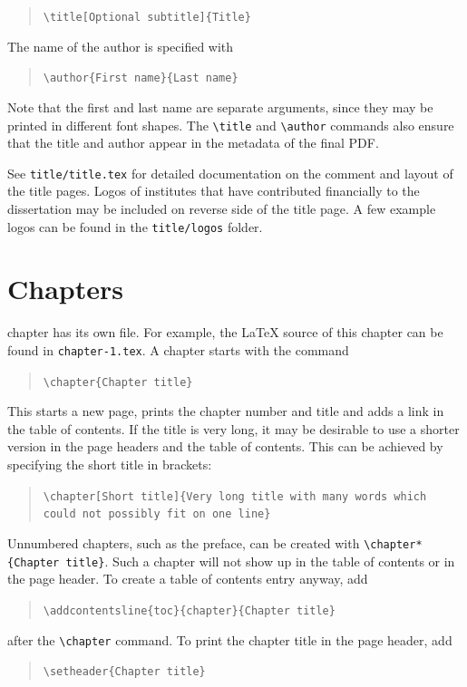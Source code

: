 \begin{quote}
\texttt{\textbackslash title[Optional subtitle]\{Title\}}
\end{quote}
The name of the author is specified with
\begin{quote}
\texttt{\textbackslash author\{First name\}\{Last name\}}
\end{quote}
Note that the first and last name are separate arguments, since they may be printed in different font shapes. The \texttt{\textbackslash title} and \texttt{\textbackslash author} commands also ensure that the title and author appear in the metadata of the final PDF.

See \texttt{title/title.tex} for detailed documentation on the comment and layout of the title pages. Logos of institutes that have contributed financially to the dissertation may be included on reverse side of the title page. A few example logos can be found in the \texttt{title/logos} folder.

\section{Chapters}

 chapter has its own file. For example, the \LaTeX{} source of this chapter can be found in \texttt{chapter-1.tex}. A chapter starts with the command

\begin{quote}
\texttt{\textbackslash chapter\{Chapter title\}}
\end{quote}
This starts a new page, prints the chapter number and title and adds a link in the table of contents. If the title is very long, it may be desirable to use a shorter version in the page headers and the table of contents. This can be achieved by specifying the short title in brackets:

\begin{quote}
\texttt{\textbackslash chapter[Short title]\{Very long title with many words which could not possibly fit on one line\}}
\end{quote}
Unnumbered chapters, such as the preface, can be created with \texttt{\textbackslash chapter*\{Chapter title\}}. Such a chapter will not show up in the table of contents or in the page header. To create a table of contents entry anyway, add
\begin{quote}
    \texttt{\textbackslash addcontentsline\{toc\}\{chapter\}\{Chapter title\}}
\end{quote}
after the \texttt{\textbackslash chapter} command. To print the chapter title in the page header, add
\begin{quote}
    \texttt{\textbackslash setheader\{Chapter title\}}
\end{quote}

